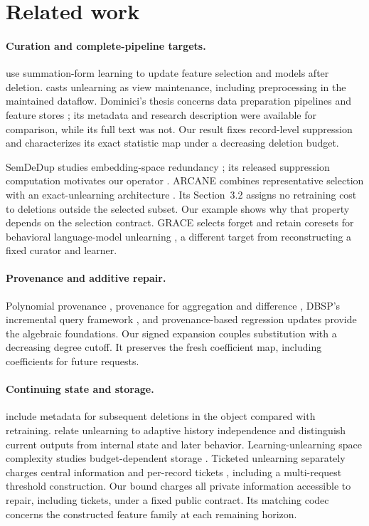 \section{Related work}\label{sec:related}
\paragraph{Curation and complete-pipeline targets.}
\citet{cao} use summation-form learning to update feature selection and
models after deletion. \citet{ivmunlearning} casts unlearning as view
maintenance, including preprocessing in the maintained dataflow.
Dominici's thesis concerns data preparation pipelines and feature stores
\citep{dominici}; its metadata and research description were available
for comparison, while its full text was not. Our result fixes record-level
suppression and characterizes its exact statistic map under a decreasing
deletion budget.

SemDeDup studies embedding-space redundancy \citep{semdedup}; its released
suppression computation motivates our operator \citep{semcode}. ARCANE
combines representative selection with an exact-unlearning architecture
\citep{arcane}. Its Section~3.2 assigns no retraining cost to deletions
outside the selected subset. Our example shows why that property depends
on the selection contract. GRACE selects forget and retain coresets for
behavioral language-model unlearning \citep{grace}, a different target
from reconstructing a fixed curator and learner.

\paragraph{Provenance and additive repair.}
Polynomial provenance \citep{green}, provenance for aggregation and
difference \citep{aggregate}, DBSP's incremental query framework
\citep{dbsp}, and provenance-based regression updates \citep{priu}
provide the algebraic foundations. Our signed expansion couples substitution
with a decreasing degree cutoff. It preserves the fresh coefficient map,
including coefficients for future requests.

\paragraph{Continuing state and storage.}
\citet{ginart} include metadata for subsequent deletions in the object
compared with retraining. \citet{cohencontrol} relate unlearning to adaptive
history independence and distinguish current outputs from internal state
and later behavior. Learning-unlearning space complexity studies
budget-dependent storage \citep{space}. Ticketed unlearning separately
charges central information and per-record tickets \citep{ticketed},
including a multi-request threshold construction. Our bound charges all
private information accessible to repair, including tickets, under a
fixed public contract. Its matching codec concerns the constructed
feature family at each remaining horizon.

